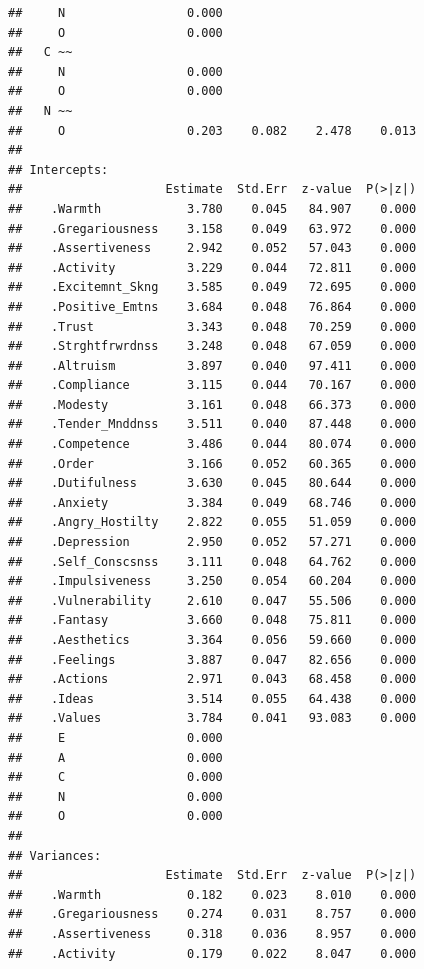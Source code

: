 \documentclass{article}\usepackage[]{graphicx}\usepackage[]{color}
\makeatletter
\newenvironment{kframe}{%
 \def\at@end@of@kframe{}%
 \ifinner\ifhmode%
  \def\at@end@of@kframe{\end{minipage}}%
  \begin{minipage}{\columnwidth}%
 \fi\fi%
 \def\FrameCommand##1{\hskip\@totalleftmargin \hskip-\fboxsep
 \colorbox{shadecolor}{##1}\hskip-\fboxsep
     \hskip-\linewidth \hskip-\@totalleftmargin \hskip\columnwidth}%
 \MakeFramed {\advance\hsize-\width
   \@totalleftmargin\z@ \linewidth\hsize
   \@setminipage}}%
 {\par\unskip\endMakeFramed%
 \at@end@of@kframe}
\newenvironment{knitrout}{}{} %
\makeatother
\begin{document}
\begin{knitrout}
\begin{kframe}
\begin{verbatim}
##     N                 0.000                           
##     O                 0.000                           
##   C ~~                                                
##     N                 0.000                           
##     O                 0.000                           
##   N ~~                                                
##     O                 0.203    0.082    2.478    0.013
## 
## Intercepts:
##                    Estimate  Std.Err  z-value  P(>|z|)
##    .Warmth            3.780    0.045   84.907    0.000
##    .Gregariousness    3.158    0.049   63.972    0.000
##    .Assertiveness     2.942    0.052   57.043    0.000
##    .Activity          3.229    0.044   72.811    0.000
##    .Excitemnt_Skng    3.585    0.049   72.695    0.000
##    .Positive_Emtns    3.684    0.048   76.864    0.000
##    .Trust             3.343    0.048   70.259    0.000
##    .Strghtfrwrdnss    3.248    0.048   67.059    0.000
##    .Altruism          3.897    0.040   97.411    0.000
##    .Compliance        3.115    0.044   70.167    0.000
##    .Modesty           3.161    0.048   66.373    0.000
##    .Tender_Mnddnss    3.511    0.040   87.448    0.000
##    .Competence        3.486    0.044   80.074    0.000
##    .Order             3.166    0.052   60.365    0.000
##    .Dutifulness       3.630    0.045   80.644    0.000
##    .Anxiety           3.384    0.049   68.746    0.000
##    .Angry_Hostilty    2.822    0.055   51.059    0.000
##    .Depression        2.950    0.052   57.271    0.000
##    .Self_Conscsnss    3.111    0.048   64.762    0.000
##    .Impulsiveness     3.250    0.054   60.204    0.000
##    .Vulnerability     2.610    0.047   55.506    0.000
##    .Fantasy           3.660    0.048   75.811    0.000
##    .Aesthetics        3.364    0.056   59.660    0.000
##    .Feelings          3.887    0.047   82.656    0.000
##    .Actions           2.971    0.043   68.458    0.000
##    .Ideas             3.514    0.055   64.438    0.000
##    .Values            3.784    0.041   93.083    0.000
##     E                 0.000                           
##     A                 0.000                           
##     C                 0.000                           
##     N                 0.000                           
##     O                 0.000                           
## 
## Variances:
##                    Estimate  Std.Err  z-value  P(>|z|)
##    .Warmth            0.182    0.023    8.010    0.000
##    .Gregariousness    0.274    0.031    8.757    0.000
##    .Assertiveness     0.318    0.036    8.957    0.000
##    .Activity          0.179    0.022    8.047    0.000

\end{verbatim}
\end{kframe}
\end{knitrout}
\end{document}
